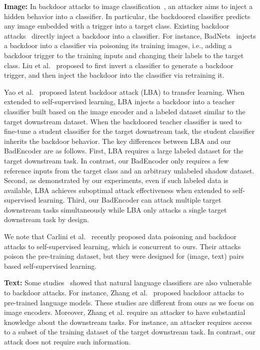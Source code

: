 \noindent
{\bf Image:} In backdoor attacks to image classification~\cite{gu2017badnets,chen2017targeted,liao2018backdoor,liutrojaning2018,yao2019latent,saha2020hidden,turner2019label,li2019invisible,tan2019bypassing,liu2020reflection,salem2020dynamic}, an attacker aims to inject a hidden behavior 
into a classifier. In particular, the backdoored classifier predicts any image embedded with a trigger into a target class. Existing backdoor attacks~\cite{gu2017badnets,chen2017targeted,liutrojaning2018,yao2019latent} directly inject a backdoor into a classifier. For instance,  BadNets~\cite{gu2017badnets} injects a backdoor into a classifier via poisoning its training images, i.e., adding a backdoor trigger to the training inputs and changing their labels to the target class. Liu et al.~\cite{liutrojaning2018} proposed to first invert a classifier to generate a backdoor trigger, and then inject the backdoor into the classifier via retraining it. 


Yao et al.~\cite{yao2019latent} proposed latent backdoor attack (LBA) to transfer learning. When extended to self-supervised learning,  LBA injects a backdoor into a teacher classifier built based on the image encoder and a labeled dataset similar to the target downstream dataset. When the backdoored teacher classifier is used to fine-tune a student classifier for the target downstream task, the student classifier inherits the backdoor behavior. The key differences between LBA and our BadEncoder are as follows. First, LBA requires a large labeled dataset for the target downstream task. 
In contrast, our BadEncoder only requires a few reference inputs from the target class and an arbitrary unlabeled shadow dataset. Second, as demonstrated by our experiments, even if such labeled data is available, LBA achieves suboptimal attack effectiveness when extended to self-supervised learning.  
Third, our BadEncoder can attack multiple target downstream tasks simultaneously while LBA only attacks a single target downstream task by design. 


We note that Carlini et al.~\cite{carlini2021poisoning} recently proposed data poisoning and backdoor attacks to self-supervised learning, which is concurrent to ours. Their attacks poison the pre-training dataset, but they were designed for (image, text) pairs based self-supervised learning. 



\noindent
{\bf Text:} Some studies~\cite{dai2019backdoor,chen2020badnl,zhang2020trojaning} showed that  natural language classifiers are also vulnerable to backdoor attacks.  
For instance, Zhang et al.~\cite{zhang2020trojaning} proposed backdoor attacks to pre-trained language models. These studies are different from ours as we focus on image encoders. Moreover, Zhang et al. require an attacker to have substantial knowledge about the downstream tasks. For instance, an attacker requires access to a subset of the training dataset of the target downstream task. In contrast, our attack does not require such information. 



